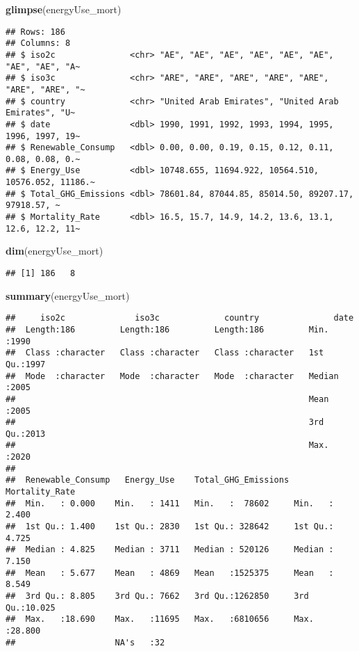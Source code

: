 \documentclass[
]{article}
\newenvironment{Shaded}{\begin{snugshade}}{\end{snugshade}}
\newcommand{\FunctionTok}[1]{\textcolor[rgb]{0.13,0.29,0.53}{\textbf{#1}}}
\newcommand{\NormalTok}[1]{#1}
\begin{document}
\begin{Shaded}
\begin{Highlighting}[]
\FunctionTok{glimpse}\NormalTok{(energyUse\_mort)}
\end{Highlighting}
\end{Shaded}

\begin{verbatim}
## Rows: 186
## Columns: 8
## $ iso2c               <chr> "AE", "AE", "AE", "AE", "AE", "AE", "AE", "AE", "A~
## $ iso3c               <chr> "ARE", "ARE", "ARE", "ARE", "ARE", "ARE", "ARE", "~
## $ country             <chr> "United Arab Emirates", "United Arab Emirates", "U~
## $ date                <dbl> 1990, 1991, 1992, 1993, 1994, 1995, 1996, 1997, 19~
## $ Renewable_Consump   <dbl> 0.00, 0.00, 0.19, 0.15, 0.12, 0.11, 0.08, 0.08, 0.~
## $ Energy_Use          <dbl> 10748.655, 11694.922, 10564.510, 10576.052, 11186.~
## $ Total_GHG_Emissions <dbl> 78601.84, 87044.85, 85014.50, 89207.17, 97918.57, ~
## $ Mortality_Rate      <dbl> 16.5, 15.7, 14.9, 14.2, 13.6, 13.1, 12.6, 12.2, 11~
\end{verbatim}

\begin{Shaded}
\begin{Highlighting}[]
\FunctionTok{dim}\NormalTok{(energyUse\_mort)}
\end{Highlighting}
\end{Shaded}

\begin{verbatim}
## [1] 186   8
\end{verbatim}

\begin{Shaded}
\begin{Highlighting}[]
\FunctionTok{summary}\NormalTok{(energyUse\_mort)}
\end{Highlighting}
\end{Shaded}

\begin{verbatim}
##     iso2c              iso3c             country               date     
##  Length:186         Length:186         Length:186         Min.   :1990  
##  Class :character   Class :character   Class :character   1st Qu.:1997  
##  Mode  :character   Mode  :character   Mode  :character   Median :2005  
##                                                           Mean   :2005  
##                                                           3rd Qu.:2013  
##                                                           Max.   :2020  
##                                                                         
##  Renewable_Consump   Energy_Use    Total_GHG_Emissions Mortality_Rate  
##  Min.   : 0.000    Min.   : 1411   Min.   :  78602     Min.   : 2.400  
##  1st Qu.: 1.400    1st Qu.: 2830   1st Qu.: 328642     1st Qu.: 4.725  
##  Median : 4.825    Median : 3711   Median : 520126     Median : 7.150  
##  Mean   : 5.677    Mean   : 4869   Mean   :1525375     Mean   : 8.549  
##  3rd Qu.: 8.805    3rd Qu.: 7662   3rd Qu.:1262850     3rd Qu.:10.025  
##  Max.   :18.690    Max.   :11695   Max.   :6810656     Max.   :28.800  
##                    NA's   :32
\end{verbatim}
\end{document}
